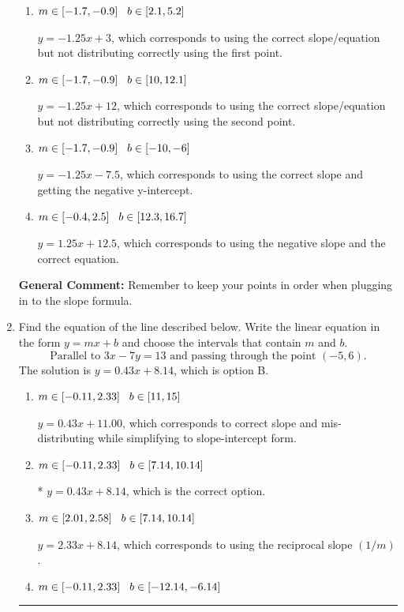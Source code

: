\documentclass{extbook}[14pt]
\newcommand{\litem}[1]{\item #1

\rule{\textwidth}{0.4pt}}
\begin{document}
\begin{enumerate}
{\begin{enumerate}[label=\Alph*.]
* $y = -1.25x + 7.5$, which is the correct option.
\item \( m \in [-1.7, -0.9] \hspace*{3mm} b \in [2.1, 5.2] \)

 $y = -1.25x + 3$, which corresponds to using the correct slope/equation but not distributing correctly using the first point.
\item \( m \in [-1.7, -0.9] \hspace*{3mm} b \in [10, 12.1] \)

 $y = -1.25x + 12$, which corresponds to using the correct slope/equation but not distributing correctly using the second point.
\item \( m \in [-1.7, -0.9] \hspace*{3mm} b \in [-10, -6] \)

 $y = -1.25x -7.5$, which corresponds to using the correct slope and getting the negative y-intercept.
\item \( m \in [-0.4, 2.5] \hspace*{3mm} b \in [12.3, 16.7] \)

 $y = 1.25x + 12.5$, which corresponds to using the negative slope and the correct equation.
\end{enumerate}

\textbf{General Comment:} Remember to keep your points in order when plugging in to the slope formula.
}
\litem{
Find the equation of the line described below. Write the linear equation in the form $ y=mx+b $ and choose the intervals that contain $m$ and $b$.
\[ \text{Parallel to } 3 x - 7 y = 13 \text{ and passing through the point } (-5, 6). \]The solution is \( y = 0.43x + 8.14 \), which is option B.\begin{enumerate}[label=\Alph*.]
\item \( m \in [-0.11, 2.33] \hspace*{3mm} b \in [11, 15] \)

 $y = 0.43x + 11.00$, which corresponds to correct slope and mis-distributing while simplifying to slope-intercept form.
\item \( m \in [-0.11, 2.33] \hspace*{3mm} b \in [7.14, 10.14] \)

* $y = 0.43x + 8.14$, which is the correct option.
\item \( m \in [2.01, 2.58] \hspace*{3mm} b \in [7.14, 10.14] \)

 $y = 2.33x + 8.14$, which corresponds to using the reciprocal slope $(1/m)$.
\item \( m \in [-0.11, 2.33] \hspace*{3mm} b \in [-12.14, -6.14] \)


\end{enumerate}}
\end{enumerate}
\end{document}
